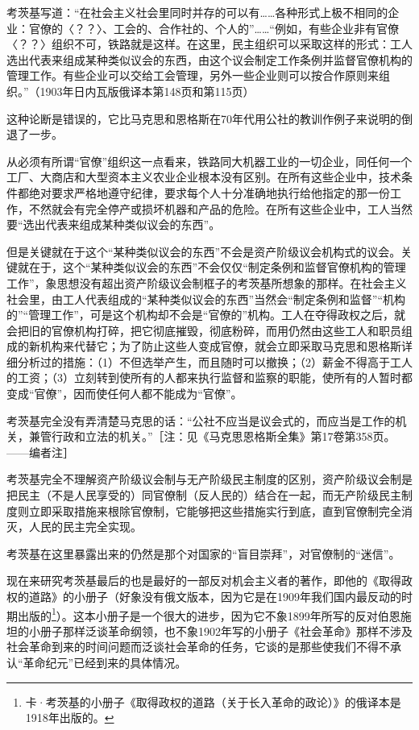 \documentclass[UTF8, 12pt, a4paper]{ctexrep}
\begin{document}
考茨基写道：“在社会主义社会里同时并存的可以有……各种形式上极不相同的企业：官僚的〈？？〉、工会的、合作社的、个人的”……“例如，有些企业非有官僚〈？？〉组织不可，铁路就是这样。在这里，民主组织可以采取这样的形式：工人选出代表来组成某种类似议会的东西，由这个议会制定工作条例并监督官僚机构的管理工作。有些企业可以交给工会管理，另外一些企业则可以按合作原则来组织。”（1903年日内瓦版俄译本第148页和第115页）

这种论断是错误的，它比马克思和恩格斯在70年代用公社的教训作例子来说明的倒退了一步。

从必须有所谓“官僚”组织这一点看来，铁路同大机器工业的一切企业，同任何一个工厂、大商店和大型资本主义农业企业根本没有区别。在所有这些企业中，技术条件都绝对要求严格地遵守纪律，要求每个人十分准确地执行给他指定的那一份工作，不然就会有完全停产或损坏机器和产品的危险。在所有这些企业中，工人当然要“选出代表来组成某种类似议会的东西”。

但是关键就在于这个“某种类似议会的东西”不会是资产阶级议会机构式的议会。关键就在于，这个“某种类似议会的东西”不会仅仅“制定条例和监督官僚机构的管理工作”，象思想没有超出资产阶级议会制框子的考茨基所想象的那样。在社会主义社会里，由工人代表组成的“某种类似议会的东西”当然会“制定条例和监督”“机构的”“管理工作”，可是这个机构却不会是“官僚的”机构。工人在夺得政权之后，就会把旧的官僚机构打碎，把它彻底摧毁，彻底粉碎，而用仍然由这些工人和职员组成的新机构来代替它；为了防止这些人变成官僚，就会立即采取马克思和恩格斯详细分析过的措施：（1）不但选举产生，而且随时可以撤换；（2）薪金不得高于工人的工资；（3）立刻转到使所有的人都来执行监督和监察的职能，使所有的人暂时都变成“官僚”，因而使任何人都不能成为“官僚”。

考茨基完全没有弄清楚马克思的话：“公社不应当是议会式的，而应当是工作的机关，兼管行政和立法的机关。”［注：见《马克思恩格斯全集》第17卷第358页。——编者注］

考茨基完全不理解资产阶级议会制与无产阶级民主制度的区别，资产阶级议会制是把民主（不是人民享受的）同官僚制（反人民的）结合在一起，而无产阶级民主制度则立即采取措施来根除官僚制，它能够把这些措施实行到底，直到官僚制完全消灭，人民的民主完全实现。

考茨基在这里暴露出来的仍然是那个对国家的“盲目崇拜”，对官僚制的“迷信”。

现在来研究考茨基最后的也是最好的一部反对机会主义者的著作，即他的《取得政权的道路》的小册子（好象没有俄文版本，因为它是在1909年我们国内最反动的时期出版的\footnote{卡·考茨基的小册子《取得政权的道路（关于长入革命的政论）》的俄译本是1918年出版的。}）。这本小册子是一个很大的进步，因为它不象1899年所写的反对伯恩施坦的小册子那样泛谈革命纲领，也不象1902年写的小册子《社会革命》那样不涉及社会革命到来的时间问题而泛谈社会革命的任务，它谈的是那些使我们不得不承认“革命纪元”已经到来的具体情况。
\end{document}
